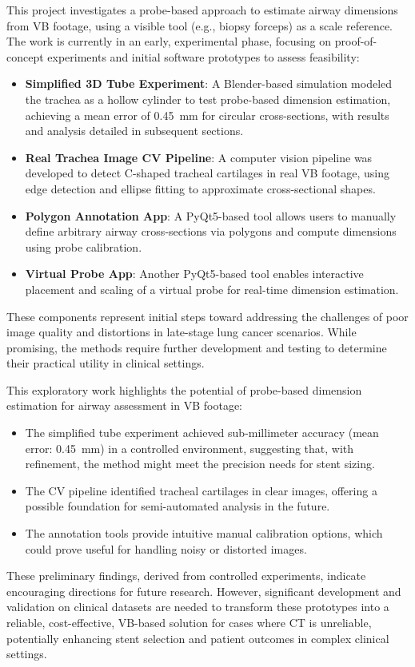 This project investigates a probe-based approach to estimate airway dimensions from VB footage, using a visible tool (e.g., biopsy forceps) as a scale reference. The work is currently in an early, experimental phase, focusing on proof-of-concept experiments and initial software prototypes to assess feasibility:
\begin{itemize}
    \item \textbf{Simplified 3D Tube Experiment}: A Blender-based simulation modeled the trachea as a hollow cylinder to test probe-based dimension estimation, achieving a mean error of 0.45~mm for circular cross-sections, with results and analysis detailed in subsequent sections.
    \item \textbf{Real Trachea Image CV Pipeline}: A computer vision pipeline was developed to detect C-shaped tracheal cartilages in real VB footage, using edge detection and ellipse fitting to approximate cross-sectional shapes.
    \item \textbf{Polygon Annotation App}: A PyQt5-based tool allows users to manually define arbitrary airway cross-sections via polygons and compute dimensions using probe calibration.
    \item \textbf{Virtual Probe App}: Another PyQt5-based tool enables interactive placement and scaling of a virtual probe for real-time dimension estimation.
\end{itemize}
These components represent initial steps toward addressing the challenges of poor image quality and distortions in late-stage lung cancer scenarios. While promising, the methods require further development and testing to determine their practical utility in clinical settings.

This exploratory work highlights the potential of probe-based dimension estimation for airway assessment in VB footage:
\begin{itemize}
    \item The simplified tube experiment achieved sub-millimeter accuracy (mean error: 0.45~mm) in a controlled environment, suggesting that, with refinement, the method might meet the precision needs for stent sizing.
    \item The CV pipeline identified tracheal cartilages in clear images, offering a possible foundation for semi-automated analysis in the future.
    \item The annotation tools provide intuitive manual calibration options, which could prove useful for handling noisy or distorted images.
\end{itemize}
These preliminary findings, derived from controlled experiments, indicate encouraging directions for future research. However, significant development and validation on clinical datasets are needed to transform these prototypes into a reliable, cost-effective, VB-based solution for cases where CT is unreliable, potentially enhancing stent selection and patient outcomes in complex clinical settings.

